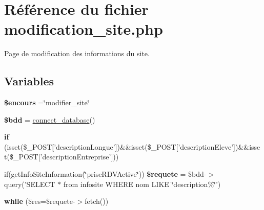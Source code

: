 \hypertarget{modification__site_8php}{\section{Référence du fichier modification\-\_\-site.\-php}
\label{modification__site_8php}
}


Page de modification des informations du site.  


\subsection*{Variables}
\begin{DoxyCompactItemize}
\item 
\hypertarget{modification__site_8php_af7b0e56292699e6983c24fbbf70ce08d}{{\bfseries \$encours} =\char`\"{}modifier\-\_\-site\char`\"{}}\label{modification__site_8php_af7b0e56292699e6983c24fbbf70ce08d}

\item 
\hypertarget{modification__site_8php_a94f91e878bce0991e2cd595c5dd79b3f}{{\bfseries \$bdd} = \hyperlink{function_8php_a1f56f7efe8c1222675d8715c259957d5}{connect\-\_\-database}()}\label{modification__site_8php_a94f91e878bce0991e2cd595c5dd79b3f}

\item 
\hypertarget{modification__site_8php_ad97683d78021f370388582d4859033f2}{{\bfseries if} (isset(\$\-\_\-\-P\-O\-S\-T\mbox{[}'description\-Longue'\mbox{]})\&\&isset(\$\-\_\-\-P\-O\-S\-T\mbox{[}'description\-Eleve'\mbox{]})\&\&isset(\$\-\_\-\-P\-O\-S\-T\mbox{[}'description\-Entreprise'\mbox{]}))}\label{modification__site_8php_ad97683d78021f370388582d4859033f2}

\item 
\hypertarget{modification__site_8php_a495cb0b7764beb4970118e5a0ae62190}{if(get\-Info\-Site\-Information(\char`\"{}prise\-R\-D\-V\-Active\char`\"{})) {\bfseries \$requete} = \$bdd-\/$>$query('S\-E\-L\-E\-C\-T $\ast$ from infosite W\-H\-E\-R\-E nom L\-I\-K\-E \char`\"{}description\%\char`\"{}')}\label{modification__site_8php_a495cb0b7764beb4970118e5a0ae62190}

\item 
\hypertarget{modification__site_8php_abb9024608005245d5e5c1c5de27f9fd5}{{\bfseries while} (\$res=\$requete-\/$>$fetch())}\label{modification__site_8php_abb9024608005245d5e5c1c5de27f9fd5}

\end{DoxyCompactItemize}



